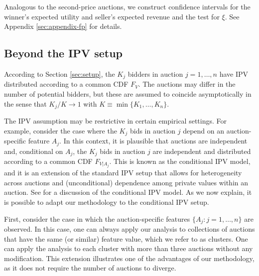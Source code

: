 Analogous to the second-price auctions, we construct confidence intervals for the winner's expected utility and seller's expected revenue and the test for $\xi$. 
See Appendix \ref{sec:appendix-fp} for details.

\subsection{Beyond the IPV setup}

According to Section \ref{sec:setup}, the $K_{j}$ bidders in auction $j=1,\dots,n$ have IPV distributed according to a common CDF $F_{V}$. The auctions may differ in the number of potential bidders, but these are assumed to coincide asymptotically in the sense that  $K_{j}/K\to 1$ with $K\equiv \min \{ K_{1},\dots,K_{n}\} $. 

The IPV assumption may be restrictive in certain empirical settings. For example, consider the case where the $K_{j}$ bids in auction $j$ depend on an auction-specific feature $A_{j}$. In this context, it is plausible that auctions are independent and, conditional on $A_{j}$, the $K_{j}$ bids in auction $j$ are independent and distributed according to a common CDF $ F_{V|A_{j}}$. This is known as the conditional IPV model, and it is an extension of the standard IPV setup that allows for heterogeneity across auctions and (unconditional) dependence among private values within an auction. See \citet{li2000cipv} for a discussion of the conditional IPV model. As we now explain, it is possible to adapt our methodology to the conditional IPV setup.

First, consider the case in which the auction-specific features $\{A_j: j=1, \dots, n\}$ are observed. In this case, one can always apply our analysis to collections of auctions that have the same (or similar) feature value, which we refer to as clusters. One can apply the analysis to each cluster with more than three auctions without any modification. This extension illustrates one of the advantages of our methodology, as it does not require the number of auctions to diverge.


